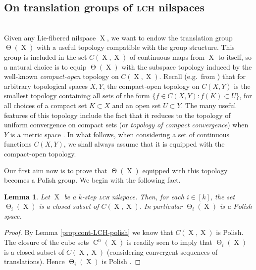 \documentclass[a4paper,12pt,reqno]{amsart}
\newtheorem{lemma}[theorem]{Lemma}
\theoremstyle{definition}
\DeclareMathOperator{\tran}{\Theta}
\DeclareMathOperator{\ns}{X}
\DeclareMathOperator{\cu}{C}
\begin{document}
\subsection{On translation groups of \textsc{lch} nilspaces}\label{sec:trans-group}\hfill\\
Given any Lie-fibered nilspace $\ns$, we want to endow the translation group $\tran(\ns)$ with a useful topology compatible with the group structure. This group is  included in the set $C(\ns,\ns)$ of continuous maps from $\ns$ to itself, so a natural choice is to equip $\tran(\ns)$ with the subspace topology induced by the well-known \emph{compact-open} topology on $C(\ns,\ns)$. 
Recall (e.g.\ from \cite[\S 46]{Mu}) that  for arbitrary topological spaces $X,Y$, the compact-open topology on $C(X,Y)$ is the smallest topology containing all sets of the form $\{f\in C(X,Y): f(K)\subset U\}$, for all choices of a compact set $K\subset X$ and an open set $U\subset Y$.
The many useful features of this topology include the fact that it reduces to the topology of uniform convergence on compact sets (or \emph{topology of compact convergence}) when $Y$ is a metric space \cite[Theorem 46.8]{Mu}. In what follows, when considering a set of continuous functions $C(X,Y)$, we shall always assume that it is equipped with the compact-open topology.

Our first aim now is to prove that $\tran(\ns)$ equipped with this topology becomes a Polish group. We begin with the following fact.

\begin{lemma}\label{lem:tran-i-closed-subset}
Let $\ns$ be a $k$-step \textsc{lch} nilspace. Then, for each $i\in[k]$, the set $\tran_i(\ns)$ is a closed subset of $C(\ns,\ns)$. In particular $\tran_i(\ns)$ is a Polish space.
\end{lemma}

\begin{proof}
By Lemma \ref{prop:cont-LCH-polish} we know that $C(\ns,\ns)$ is Polish. The closure of the cube sets $\cu^n(\ns)$ is readily seen to imply that $\tran_i(\ns)$ is a closed subset of $C(\ns,\ns)$ (considering convergent sequences of translations). Hence $\tran_i(\ns)$ is Polish \cite[(3.3) Proposition]{Kechris}.
\end{proof}
\end{document}
